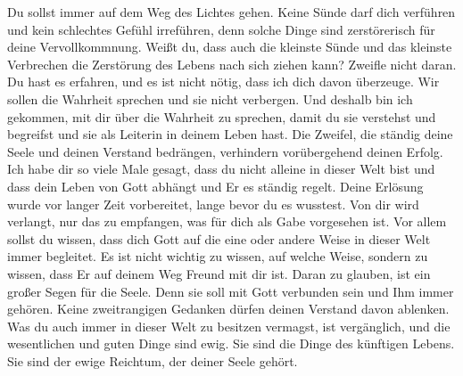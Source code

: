 Du sollst immer auf dem Weg des Lichtes gehen. Keine Sünde darf dich verführen und kein schlechtes Gefühl irreführen, denn solche Dinge sind zerstörerisch für deine Vervollkommnung. Weißt du, dass auch die kleinste Sünde und das kleinste Verbrechen die Zerstörung des Lebens nach sich ziehen kann? Zweifle nicht daran. Du hast es erfahren, und es ist nicht nötig, dass ich dich davon überzeuge. Wir sollen die Wahrheit sprechen und sie nicht verbergen. Und deshalb bin ich gekommen, mit dir über die Wahrheit zu sprechen, damit du sie verstehst und begreifst und sie als Leiterin in deinem Leben hast. Die Zweifel, die ständig deine Seele und deinen Verstand bedrängen, verhindern vorübergehend deinen Erfolg. Ich habe dir so viele Male gesagt, dass du nicht alleine in dieser Welt bist und dass dein Leben von Gott abhängt und Er es ständig regelt. Deine Erlösung wurde vor langer Zeit vorbereitet, lange bevor du es wusstest. Von dir wird verlangt, nur das zu empfangen, was für dich als Gabe vorgesehen ist. Vor allem sollst du wissen, dass dich Gott auf die eine oder andere Weise in dieser Welt immer begleitet. Es ist nicht wichtig zu wissen, auf welche Weise, sondern zu wissen, dass Er auf deinem Weg Freund mit dir ist. Daran zu glauben, ist ein großer Segen für die Seele. Denn sie soll mit Gott verbunden sein und Ihm immer gehören. Keine zweitrangigen Gedanken dürfen deinen Verstand davon ablenken. Was du auch immer in dieser Welt zu besitzen vermagst, ist vergänglich, und die wesentlichen und guten Dinge sind ewig. Sie sind die Dinge des künftigen Lebens. Sie sind der ewige Reichtum, der deiner Seele gehört. 

